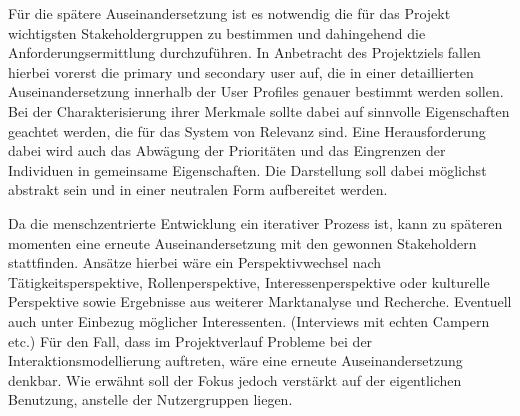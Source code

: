 Für die spätere Auseinandersetzung ist es notwendig die für das Projekt wichtigsten Stakeholdergruppen zu bestimmen und dahingehend die Anforderungsermittlung durchzuführen.
In Anbetracht des Projektziels fallen hierbei vorerst die primary und secondary user auf, die in einer detaillierten Auseinandersetzung innerhalb der User Profiles genauer bestimmt werden sollen.
Bei der Charakterisierung ihrer Merkmale sollte dabei auf sinnvolle Eigenschaften geachtet werden, die für das System von Relevanz sind. Eine Herausforderung dabei wird auch das Abwägung der Prioritäten und das Eingrenzen der Individuen in gemeinsame Eigenschaften. Die Darstellung soll dabei möglichst abstrakt sein und in einer neutralen Form aufbereitet werden.
 
Da die menschzentrierte Entwicklung ein iterativer Prozess ist, kann zu späteren momenten eine erneute Auseinandersetzung mit den gewonnen Stakeholdern stattfinden.
Ansätze hierbei wäre ein Perspektivwechsel nach Tätigkeitsperspektive, Rollenperspektive, Interessenperspektive oder kulturelle Perspektive sowie Ergebnisse aus weiterer Marktanalyse und Recherche. Eventuell auch unter Einbezug möglicher Interessenten. (Interviews mit echten Campern etc.) Für den Fall, dass im Projektverlauf Probleme bei der Interaktionsmodellierung auftreten, wäre eine erneute Auseinandersetzung denkbar. Wie erwähnt soll der Fokus  jedoch verstärkt auf der eigentlichen Benutzung, anstelle der Nutzergruppen liegen.\\
 



